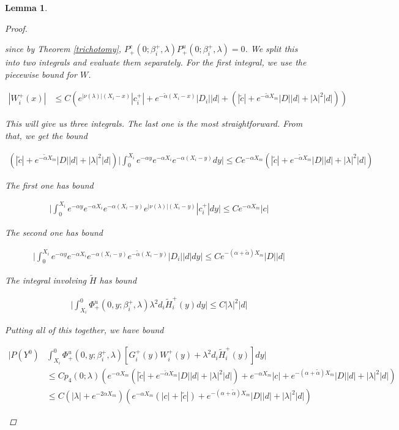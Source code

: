 \documentclass[12pt]{article}
\newtheorem{lemma}{Lemma}
\begin{document}
\begin{lemma}
\begin{proof}
\begin{enumerate}
since by Theorem \ref{trichotomy}, $P^c_+(0; \beta_i^+, \lambda) P^u_+(0; \beta_i^+, \lambda) = 0$. We split this into two integrals and evaluate them separately. For the first integral, we use the piecewise bound for $W$.

\begin{align*}
|W_i^+(x)| &\leq C ( e^{|\nu(\lambda)|(X_i - x)} |c_i^+| + e^{-\tilde{\alpha}(X_i - x)}|D_i||d| + (|\tilde{c}| + e^{-\tilde{\alpha}X_m}|D||d| + |\lambda|^2 |d| ))
\end{align*}

This will give us three integrals. The last one is the most straightforward. From that, we get the bound

\begin{align*}
(|\tilde{c}| + e^{-\tilde{\alpha}X_m}|D||d| + |\lambda|^2 |d| ) \Big|  \int_0^{X_i} e^{-\alpha y} e^{-\alpha X_i} e^{-\alpha (X_i - y)} dy \Big| \leq C e^{-\alpha X_m } (|\tilde{c}| + e^{-\tilde{\alpha}X_m}|D||d| + |\lambda|^2 |d| )
\end{align*}

The first one has bound

\begin{align*}
\Big|  \int_0^{X_i} e^{-\alpha y} e^{-\alpha X_i} e^{-\alpha (X_i - y)} e^{|\nu(\lambda)|(X_i - y)} |c_i^+| dy \Big| \leq C e^{-\alpha X_m } |c|
\end{align*}

The second one has bound

\begin{align*}
\Big|  \int_0^{X_i} e^{-\alpha y} e^{-\alpha X_i} e^{-\alpha (X_i - y)} e^{-\tilde{\alpha}(X_i - y)}|D_i||d|  dy \Big| \leq C e^{-(\alpha + \tilde{\alpha}) X_m } |D||d|
\end{align*}

The integral involving $\tilde{H}$ has bound

\begin{align*}
\Big| \int_{X_i}^0 \Phi^u_+(0, y; \beta_i^+, \lambda) \lambda^2 d_i \tilde{H}_i^+(y) dy \Big| \leq C |\lambda|^2 |d|
\end{align*}

Putting all of this together, we have bound

\begin{align*}
\Big| P(Y^0) &\int_{X_i}^0 \Phi^u_+(0, y; \beta_i^+, \lambda) [ G_i^+(y)W_i^+(y) + \lambda^2 d_i \tilde{H}_i^+(y) ] dy \Big| \\
&\leq C p_4(0; \lambda)( e^{-\alpha X_m } (|\tilde{c}| + e^{-\tilde{\alpha}X_m}|D||d| + |\lambda|^2 |d| ) + e^{-\alpha X_m } |c| + e^{-(\alpha + \tilde{\alpha}) X_m } |D||d| + |\lambda|^2|d|) \\
&\leq C (|\lambda| + e^{-2 \alpha X_m})( e^{-\alpha X_m}(|c| + |\tilde{c}|) +  e^{-(\alpha + \tilde{\alpha}) X_m } |D||d| + |\lambda|^2|d|)
\end{align*}


\end{enumerate}
\end{proof}
\end{lemma}
\end{document}
